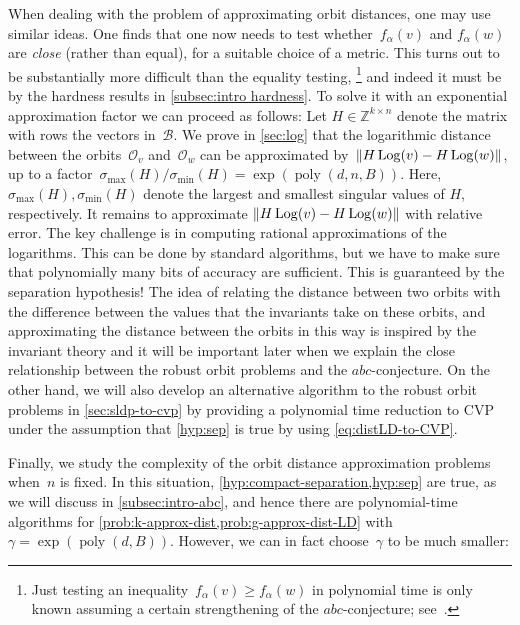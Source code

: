 \documentclass[a4paper,USenglish,cleveref,numberwithinsect]{lipics-v2021}
\DeclareMathOperator{\poly}{poly}
\DeclareMathOperator{\Log}{Log}
\newcommand{\ZZ}{\mathbb{Z}}
\newcommand{\OO}{\ensuremath{\mathcal{O}}}
\newcommand{\NP}{\ensuremath{\mathsf{NP}}\xspace}
\newcommand{\abc}{\texorpdfstring{$abc$}{abc}}
\DeclarePairedDelimiter\abs{\lvert}{\rvert}
\DeclarePairedDelimiter\norm{\lVert}{\rVert}
\numberwithin{equation}{section}
\begin{document}
When dealing with the problem of approximating orbit distances, one may use similar ideas.
One finds that one now needs to test whether~$f_\alpha(v)$
and $f_\alpha(w)$ are \emph{close} (rather than equal),
for a suitable choice of a metric.
This turns out to be substantially more difficult than the equality testing,%
\footnote{Just testing an inequality~$f_\alpha(v) \ge f_\alpha(w)$ in polynomial time is only known assuming a certain strengthening of the \abc-conjecture; see~\cite{mono-testing-abc}.}
and indeed it must be by the hardness results in \cref{subsec:intro hardness}.
To solve it with an exponential approximation factor we can proceed as follows:
Let $H\in\ZZ^{k\times n}$ denote the matrix with rows the vectors in~$\mathcal B$.
We prove in \cref{sec:log} that the logarithmic distance between the orbits~$\OO_v$ and~$\OO_w$
can be approximated by~$\norm{H \Log(v) - H \Log(w)}$,
up to a factor~$\sigma_{\max}(H)/\sigma_{\min}(H) = \exp(\poly(d,n,B))$.
Here, $\sigma_{\max}(H),\sigma_{\min}(H)$ denote the largest and smallest singular values of $H$, respectively.
It remains to approximate $\norm{H \Log(v) - H \Log(w)}$ with relative error.
The key challenge is in computing rational approximations of the logarithms.
This can be done by standard algorithms, but we have to make sure
that polynomially many bits of accuracy are sufficient.
This is guaranteed by the separation hypothesis!
The idea of relating the distance between two orbits with the difference
between the values that the invariants take on these orbits,
and approximating the distance between the orbits in this way is inspired by the invariant theory
and it will be important later
when we explain the close relationship between the robust orbit problems and the \abc-conjecture.
On the other hand,
we will also develop an alternative algorithm to the robust orbit problems in \cref{sec:sldp-to-cvp}
by providing a polynomial time reduction to CVP under the assumption that \cref{hyp:sep} is true
by using \cref{eq:distLD-to-CVP}.


Finally, we study the complexity of the orbit distance approximation problems when~$n$ is fixed.
In this situation, \cref{hyp:compact-separation,hyp:sep} are true,
as we will discuss in \cref{subsec:intro-abc},
and hence there are polynomial-time algorithms for \cref{prob:k-approx-dist,prob:g-approx-dist-LD}
with $\gamma=\exp(\poly(d,B))$.
However, we can in fact choose~$\gamma$ to be much smaller:
\end{document}
